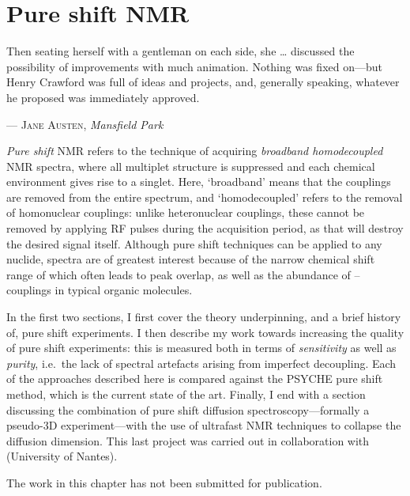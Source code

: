 \chapter{Pure shift NMR}
\label{chpt:pureshift}

\epigraph{\singlespacing%
Then seating herself with a gentleman on each side, she \ldots{} discussed the possibility of improvements with much animation. Nothing was fixed on---but Henry Crawford was full of ideas and projects, and, generally speaking, whatever he proposed was immediately approved.
}{--- \textsc{Jane Austen}, \textit{Mansfield Park}}

\textit{Pure shift} NMR refers to the technique of acquiring \textit{broadband homodecoupled} NMR spectra, where all multiplet structure is suppressed and each chemical environment gives rise to a singlet.\autocite{Zangger2015PNMRS,Castanar2017MRC}
Here, `broadband' means that the couplings are removed from the entire spectrum, and `homodecoupled' refers to the removal of homonuclear couplings: unlike heteronuclear couplings, these cannot be removed by applying RF pulses during the acquisition period, as that will destroy the desired signal itself.
Although pure shift techniques can be applied to any nuclide, \proton{} spectra are of greatest interest because of the narrow chemical shift range of \proton{} which often leads to peak overlap, as well as the abundance of \proton{}--\proton{} couplings in typical organic molecules.

In the first two sections, I first cover the theory underpinning, and a brief history of, pure shift experiments.
I then describe my work towards increasing the quality of pure shift experiments: this is measured both in terms of \textit{sensitivity} as well as \textit{purity}, i.e.\ the lack of spectral artefacts arising from imperfect decoupling.
Each of the approaches described here is compared against the PSYCHE pure shift method, which is the current state of the art.
Finally, I end with a section discussing the combination of pure shift diffusion spectroscopy---formally a pseudo-3D experiment---with the use of ultrafast NMR techniques to collapse the diffusion dimension.
This last project was carried out in collaboration with \JND{} (University of Nantes).

The work in this chapter has not been submitted for publication.

\clearpage










\printbibliography[heading=subbibnumbered]{}
